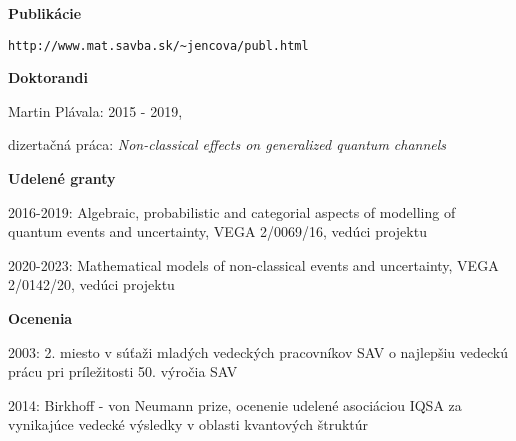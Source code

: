 \documentclass[12pt]{article}
\begin{document}
\noindent
\textbf{Publikácie}

\begin{verbatim}http://www.mat.savba.sk/~jencova/publ.html\end{verbatim}


\noindent
\textbf{Doktorandi}
\begin{description}[noitemsep,leftmargin=1.3cm, font=\normalfont]
\item{Martin Plávala:} 2015 - 2019, 

dizertačná práca: \emph{Non-classical effects on generalized quantum channels}
 
\end{description}

\noindent
\textbf{Udelené granty}
\begin{description}[noitemsep,leftmargin=1.3cm, font=\normalfont]
\item{2016-2019:} Algebraic, probabilistic and categorial aspects of modelling of quantum
events and uncertainty, VEGA 2/0069/16, vedúci projektu
\item{2020-2023:} Mathematical models of non-classical events and uncertainty, VEGA
2/0142/20, vedúci projektu

\end{description}

\noindent
\textbf{Ocenenia}
\begin{description}[noitemsep,leftmargin=1.3cm, font=\normalfont]
\item{2003: }   2. miesto v súťaži  mladých vedeckých pracovníkov SAV o najlepšiu vedeckú prácu pri príležitosti 50. výročia SAV

\item{2014:} Birkhoff - von Neumann prize, ocenenie udelené asociáciou IQSA za vynikajúce vedecké výsledky v oblasti kvantových štruktúr
\end{description}

%
\end{document}
